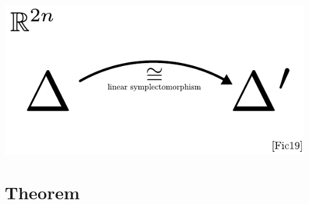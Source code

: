 \documentclass[compress]{beamer}
\begin{document}
\begin{frame}
\begin{center}
\begin{overprint}
      \includegraphics[scale=1.0]{../img/introduction/12.pdf}
    \end{overprint}
  \end{center}
\end{frame}

\blankframe{}

\section{Theorem}
\end{document}
